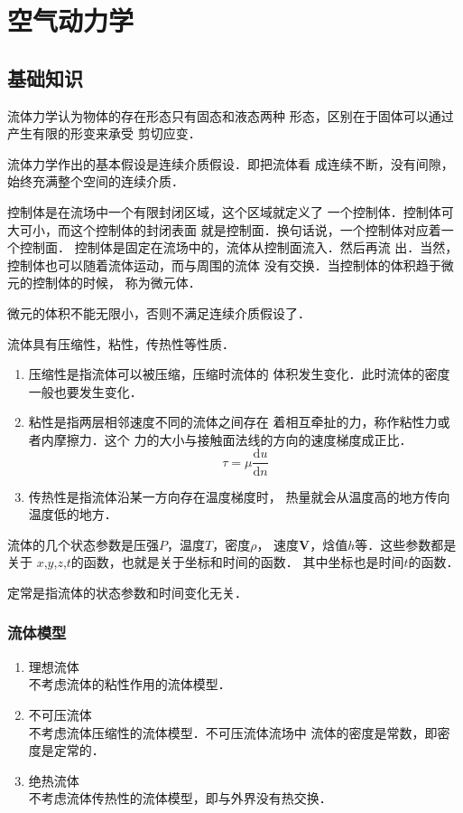 
\part{空气动力学}
\chapter{基础知识}
流体力学认为物体的存在形态只有固态和液态两种
形态，区别在于固体可以通过产生有限的形变来承受
剪切应变．

流体力学作出的基本假设是连续介质假设．即把流体看
成连续不断，没有间隙，始终充满整个空间的连续介质．

控制体是在流场中一个有限封闭区域，这个区域就定义了
一个控制体．控制体可大可小，而这个控制体的封闭表面
就是控制面．换句话说，一个控制体对应着一个控制面．
控制体是固定在流场中的，流体从控制面流入．然后再流
出．当然，控制体也可以随着流体运动，而与周围的流体
没有交换．当控制体的体积趋于微元的控制体的时候，
称为微元体．
\begin{notice}
	微元的体积不能无限小，否则不满足连续介质假设了．
\end{notice}

流体具有压缩性，粘性，传热性等性质．
\begin{enumerate}
	\item 压缩性是指流体可以被压缩，压缩时流体的
	      体积发生变化．此时流体的密度一般也要发生变化．
	\item 粘性是指两层相邻速度不同的流体之间存在
	      着相互牵扯的力，称作粘性力或者内摩擦力．这个
	      力的大小与接触面法线的方向的速度梯度成正比．
	      \[
		      \tau=\mu \frac{\mathrm{d}u}{\mathrm{d}n}
	      \]
	\item 传热性是指流体沿某一方向存在温度梯度时，
	      热量就会从温度高的地方传向温度低的地方．
\end{enumerate}

流体的几个状态参数是压强$P$，温度$T$，密度$\rho$，
速度$\mathbf{V}$，焓值$h$等．这些参数都是关于
$x$,$y$,$z$,$t$的函数，也就是关于坐标和时间的函数．
其中坐标也是时间$t$的函数．

定常是指流体的状态参数和时间变化无关．

\section{流体模型}
\begin{enumerate}
	\item 理想流体 \\
	      不考虑流体的粘性作用的流体模型．
	\item 不可压流体 \\
	      不考虑流体压缩性的流体模型．不可压流体流场中
	      流体的密度是常数，即密度是定常的．
	\item 绝热流体 \\
	      不考虑流体传热性的流体模型，即与外界没有热交换．
\end{enumerate}

